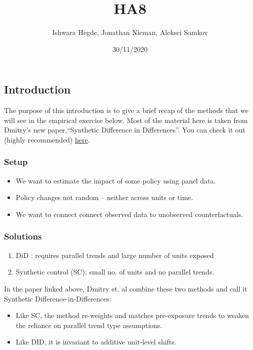 \documentclass[
]{article}
\title{HA8}
\author{Ishwara Hegde, Jonathan Nieman, Aleksei Samkov}
\date{30/11/2020}
\providecommand{\tightlist}{%
  \setlength{\itemsep}{0pt}\setlength{\parskip}{0pt}}
\begin{document}
\maketitle

\hypertarget{introduction}{%
\subsection{Introduction}\label{introduction}}

The purpose of this introduction is to give a brief recap of the methods
that we will see in the empirical exercise below. Most of the material
here is taken from Dmitry's new paper,``Synthetic Difference in
Differences''. You can check it out (highly recommended)
\href{https://arxiv.org/pdf/1812.09970.pdf}{here}.

\hypertarget{setup}{%
\subsubsection{Setup}\label{setup}}

\begin{itemize}
\tightlist
\item
  We want to estimate the impact of some policy using panel data.
\item
  Policy changes not random -- neither across units or time.
\item
  We want to connect connect observed data to unobserved
  counterfactuals.
\end{itemize}

\hypertarget{solutions}{%
\subsubsection{Solutions}\label{solutions}}

\begin{enumerate}
\def\labelenumi{\arabic{enumi}.}
\tightlist
\item
  DiD : requires parallel trends and large number of units exposed
\item
  Synthetic control (SC): small no. of units and no parallel trends.
\end{enumerate}

In the paper linked above, Dmitry et. al combine these two methods and
call it Synthetic Difference-in-Differences:

\begin{itemize}
\item
  Like SC, the method re-weights and matches pre-exposure trends to
  weaken the reliance on parallel trend type assumptions.
\item
  Like DID, it is invariant to additive unit-level shifts.
\end{itemize}
\end{document}
